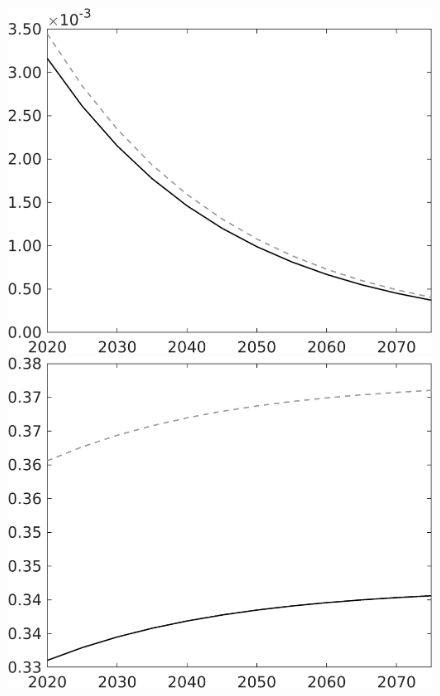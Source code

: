 \documentclass[12pt]{article}
\begin{document}
\begin{figure}[h!!]
\begin{minipage}[]{0.32\textwidth}
\end{minipage}	
\begin{minipage}[]{0.32\textwidth}
\includegraphics[width=1\textwidth]{../../codding_model/own_basedOnFried/optimalPol_010922_revision/figures/all_13Sept22/CompTaul_Equlab_LFBAU_Reg0_Lg_spillover0_nsk1_xgr1_knspil1_sep1_countec0_GovRev0_etaa0.79_lgd0.png}
\end{minipage}	
\begin{minipage}[]{0.32\textwidth}
\includegraphics[width=1\textwidth]{../../codding_model/own_basedOnFried/optimalPol_010922_revision/figures/all_13Sept22/CompTaul_Equlab_LFBAU_Reg0_Ln_spillover0_nsk1_xgr1_knspil1_sep1_countec0_GovRev0_etaa0.79_lgd0.png}

\end{minipage}
\end{figure}
\end{document}
